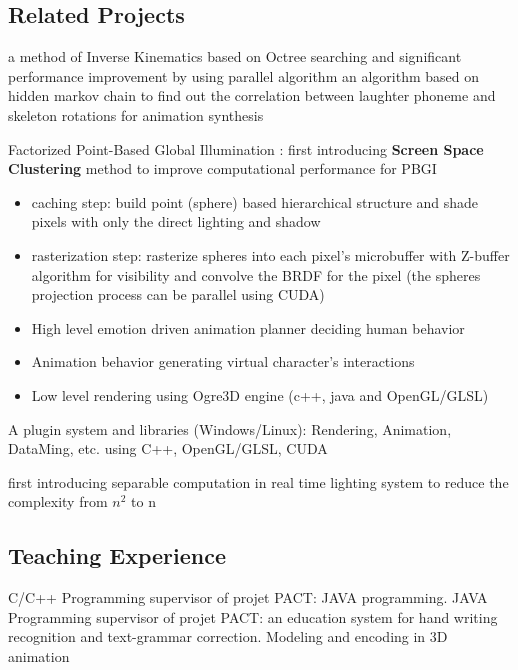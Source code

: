 \subsection{Related Projects}
{
a method of Inverse Kinematics based on Octree searching and significant performance improvement by using parallel algorithm
}
{
an algorithm based on hidden markov chain to find out the correlation between laughter phoneme and skeleton rotations for animation synthesis 
}

{
Factorized Point-Based Global Illumination : first introducing \textbf{Screen Space Clustering} method to improve computational performance for PBGI
\begin{itemize}
	\item caching step: build point (sphere) based hierarchical structure and shade pixels with only the direct lighting and shadow
	\item rasterization step: rasterize spheres into each pixel's microbuffer with Z-buffer algorithm for visibility and convolve the BRDF for the pixel (the spheres projection process can be parallel using CUDA)
\end{itemize}
}

{
\begin{itemize}
\item High level emotion driven animation planner deciding human behavior
\item Animation behavior generating virtual character's interactions
\item Low level rendering using Ogre3D engine (c++, java and OpenGL/GLSL)
\end{itemize}
}

{
A plugin system and libraries (Windows/Linux): Rendering, Animation, DataMing, etc.
using C++, OpenGL/GLSL, CUDA
}

{
first introducing separable computation in real time lighting system to reduce the complexity from $n^2$ to n
}

\subsection{Teaching Experience}
{
C/C++ Programming
}
{
supervisor of projet PACT: JAVA programming.
}
{
JAVA Programming
}
{
supervisor of projet PACT: an education system for hand writing recognition and text-grammar correction.
}
{
Modeling and encoding in 3D animation
}

